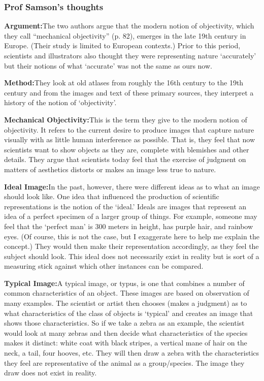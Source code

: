 \documentclass[a4paper]{article}
\begin{document}
\subsubsection{Prof Samson's thoughts}
\textbf{Argument:}\quad The two authors argue that the modern notion of objectivity, which they call ``mechanical objectivity'' (p. 82), emerges in the late 19th century in Europe. (Their study is limited to European contexts.) Prior to this period, scientists and illustrators also thought they were representing nature `accurately' but their notions of what `accurate' was not the same as ours now.

\bigskip

\noindent\textbf{Method:}\quad They look at old atlases from roughly the 16th century to the 19th century and from the images and text of these primary sources, they interpret a history of the notion of `objectivity'.

\bigskip

\noindent\textbf{Mechanical Objectivity:}\quad This is the term they give to the modern notion of objectivity. It refers to the current desire to produce images that capture nature visually with as little human interference as possible. That is, they feel that now scientists want to show objects as they are, complete with blemishes and other details. They argue that scientists today feel that the exercise of judgment on matters of aesthetics distorts or makes an image less true to nature.

\bigskip

\noindent\textbf{Ideal Image:}\quad In the past, however, there were different ideas as to what an image should look like. One idea that influenced the production of scientific representations is the notion of the `ideal.' Ideals are images that represent an idea of a perfect specimen of a larger group of things. For example, someone may feel that the `perfect man' is 300 meters in height, has purple hair, and rainbow eyes. (Of course, this is not the case, but I exaggerate here to help me explain the concept.) They would then make their representation accordingly, as they feel the subject should look. This ideal does not necessarily exist in reality but is sort of a measuring stick against which other instances can be compared.

\bigskip

\noindent\textbf{Typical Image:}\quad A typical image, or typus, is one that combines a number of common characteristics of an object. These images are based on observation of many examples. The scientist or artist then chooses (makes a judgment) as to what characteristics of the class of objects is `typical' and creates an image that shows those characteristics. So if we take a zebra as an example, the scientist would look at many zebras and then decide what characteristics of the species makes it distinct: white coat with black stripes, a vertical mane of hair on the neck, a tail, four hooves, etc. They will then draw a zebra with the characteristics they feel are representative of the animal as a group/species. The image they draw does not exist in reality.
\end{document}
